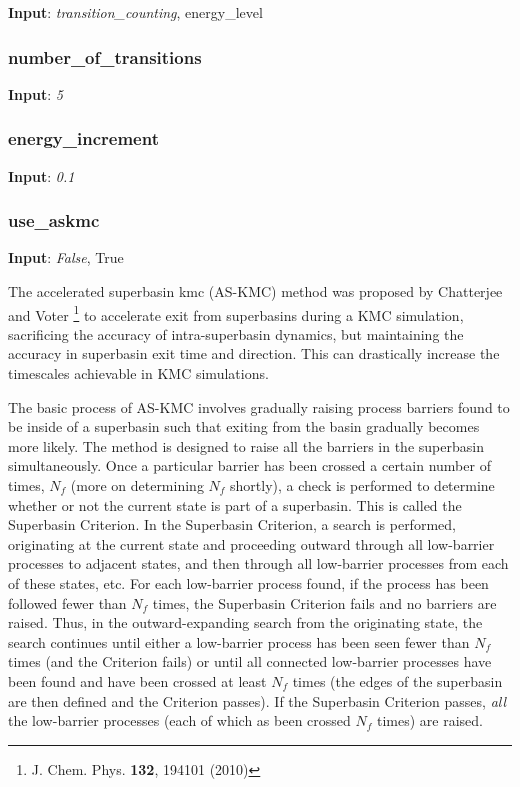 \documentclass{article}
\begin{document}
\noindent\textbf{Input}:  \emph{transition\_counting}, energy\_level

\subsubsection{number\_of\_transitions}

\noindent\textbf{Input}:  \emph{5}

\subsubsection{energy\_increment}

\noindent\textbf{Input}:  \emph{0.1}

\subsubsection{use\_askmc}

\noindent\textbf{Input}:  \emph{False}, True

The accelerated superbasin kmc (AS-KMC) method was proposed by Chatterjee and Voter \footnote{J. Chem. Phys. {\bf 132}, 194101 (2010)} to accelerate exit from superbasins during a KMC simulation, sacrificing the accuracy of intra-superbasin dynamics, but maintaining the accuracy in superbasin exit time and direction.  This can drastically increase the timescales achievable in KMC simulations.

The basic process of AS-KMC involves gradually raising process barriers found to be inside of a superbasin such that exiting from the basin gradually becomes more likely.  The method is designed to raise all the barriers in the superbasin simultaneously.  Once a particular barrier has been crossed a certain number of times, $N_f$ (more on determining $N_f$ shortly), a check is performed to determine whether or not the current state is part of a superbasin.  This is called the Superbasin Criterion.  In the Superbasin Criterion, a search is performed, originating at the current state and proceeding outward through all low-barrier processes to adjacent states, and then through all low-barrier processes from each of these states, etc.  For each low-barrier process found, if the process has been followed fewer than $N_f$ times, the Superbasin Criterion fails and no barriers are raised.  Thus, in the outward-expanding search from the originating state, the search continues until either a low-barrier process has been seen fewer than $N_f$ times (and the Criterion fails) or until all connected low-barrier processes have been found and have been crossed at least $N_f$ times (the edges of the superbasin are then defined and the Criterion passes).  If the Superbasin Criterion  passes, \emph{all} the low-barrier processes (each of which as been crossed $N_f$ times) are raised.
\end{document}
